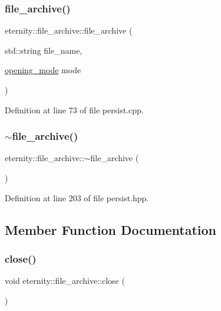 \subsubsection{\texorpdfstring{file\+\_\+archive()}{file\_archive()}\hspace{0.1cm}{\footnotesize\ttfamily [2/2]}}
{\footnotesize\ttfamily eternity\+::file\+\_\+archive\+::file\+\_\+archive (\begin{DoxyParamCaption}\item[{std\+::string}]{file\+\_\+name,  }\item[{\hyperlink{classeternity_1_1archive_a8881f9ce8dbed2ee600c64b7925afef0}{opening\+\_\+mode}}]{mode }\end{DoxyParamCaption})}



Definition at line 73 of file persist.\+cpp.

\mbox{\label{classeternity_1_1file__archive_a122b37e9949cd1a2f6279ed23d01d97f}} 
\subsubsection{\texorpdfstring{$\sim$file\+\_\+archive()}{~file\_archive()}}
{\footnotesize\ttfamily eternity\+::file\+\_\+archive\+::$\sim$file\+\_\+archive (\begin{DoxyParamCaption}{ }\end{DoxyParamCaption})\hspace{0.3cm}{\ttfamily [inline]}}



Definition at line 203 of file persist.\+hpp.



\subsection{Member Function Documentation}
\mbox{\label{classeternity_1_1file__archive_aa42b3bfaf4e595f61ec07bec48676d46}} 
\subsubsection{\texorpdfstring{close()}{close()}}
{\footnotesize\ttfamily void eternity\+::file\+\_\+archive\+::close (\begin{DoxyParamCaption}{ }\end{DoxyParamCaption})\hspace{0.3cm}{\ttfamily [inline]}}



